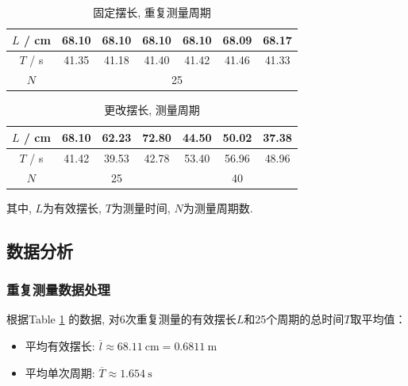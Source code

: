 \documentclass[9pt,a4paper,twoside]{../rho-class/rho}
\begin{document}
\begin{table}[H]
    \centering
    \begin{tabular}{|c|c|c|c|c|c|c|}
        \hline
        $L$ / \unit{\centi\metre} & 68.10                    & 68.10 & 68.10 & 68.10 & 68.09 & 68.17 \\ \hline
        $T$ / \unit{\second}      & 41.35                    & 41.18 & 41.40 & 41.42 & 41.46 & 41.33 \\ \hline
        $N$                       & \multicolumn{6}{|c|}{25}                                         \\ \hline
    \end{tabular}
    \caption{固定摆长, 重复测量周期}
    \label{tab:table-1}
\end{table}

\begin{table}[H]
    \centering
    \begin{tabular}{|c|c|c|c|c|c|c|}
        \hline
        $L$ / \unit{\centi\metre} & 68.10                    & 62.23                    & 72.80 & 44.50 & 50.02 & 37.38 \\ \hline
        $T$ / \unit{\second}      & 41.42                    & 39.53                    & 42.78 & 53.40 & 56.96 & 48.96 \\ \hline
        $N$                       & \multicolumn{3}{|c|}{25} & \multicolumn{3}{|c|}{40}                                 \\ \hline
    \end{tabular}
    \caption{更改摆长, 测量周期}
    \label{tab:table-2}
\end{table}

其中, $L$为有效摆长, $T$为测量时间, $N$为测量周期数.

\subsection{数据分析}

\subsubsection{重复测量数据处理}
根据Table \ref{tab:table-1} 的数据, 对6次重复测量的有效摆长$L$和25个周期的总时间$T$取平均值：
\begin{itemize}
    \item 平均有效摆长: $\overline{l} \approx \qty{68.11}{\centi\metre} = \qty{0.6811}{\metre}$
    \item 平均单次周期: $\overline{T} \approx \qty{1.654}{\second}$
\end{itemize}
\end{document}
